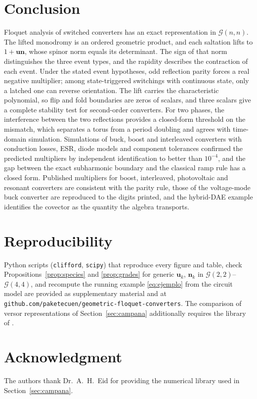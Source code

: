 \documentclass[journal]{IEEEtran}
\newcommand{\Gnn}{\mathcal{G}(n,n)}
\begin{document}
\section{Conclusion}
Floquet analysis of switched converters has an exact representation in
$\Gnn$. The lifted monodromy is an ordered geometric product, and each
saltation lifts to $1+\bm{u}\bm{n}$, whose spinor norm equals its
determinant. The sign of that norm distinguishes the three event types,
and the rapidity describes the contraction of each event. Under the stated
event hypotheses, odd reflection parity forces a real negative multiplier;
among state-triggered switchings with continuous state, only a latched one
can reverse orientation. The lift carries the characteristic polynomial, so
flip and fold boundaries are zeros of scalars, and three scalars give a
complete stability test for second-order converters. For two phases, the
interference between the two reflections provides a closed-form threshold on
the mismatch, which separates a torus from a period doubling and agrees with
time-domain simulation. Simulations of buck, boost and interleaved converters with
conduction losses, ESR, diode models and component tolerances confirmed the
predicted multipliers by independent identification to better than
$10^{-4}$, and the gap between the exact subharmonic boundary and the
classical ramp rule has a closed form. Published multipliers for boost,
interleaved, photovoltaic and resonant converters are consistent with the
parity rule, those of the voltage-mode buck converter are reproduced to the
digits printed, and the hybrid-DAE example identifies the covector as the
quantity the algebra transports.

\section*{Reproducibility}
Python scripts (\texttt{clifford}, \texttt{scipy}) that reproduce every
figure and table, check Propositions~\ref{prop:species} and
\ref{prop:grades} for generic $\bm{u}_k$, $\bm{n}_k$ in
$\mathcal{G}(2,2)$--$\mathcal{G}(4,4)$, and recompute the running example
\eqref{eq:ejemplo} from the circuit model are provided as supplementary
material and at
\texttt{github.com/paketecuen/\allowbreak{}geometric-floquet-converters}.
The comparison of versor representations of Section~\ref{sec:campana}
additionally requires the library of \cite{eid2025gafl}.

\section*{Acknowledgment}
The authors thank Dr.~A.~H.~Eid for providing the numerical library used in
Section~\ref{sec:campana}.
\end{document}
